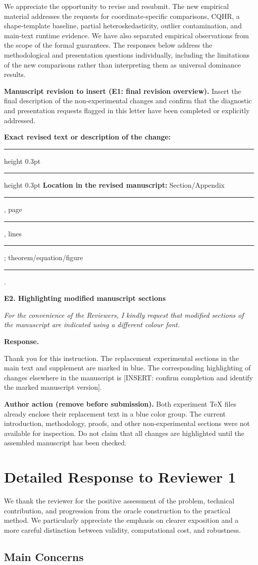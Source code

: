 \documentclass[11pt]{article}
\numberwithin{equation}{section}
\newcommand{\pending}[1]{\textcolor{AuthorRed}{[INSERT: #1]}}
\newcommand{\authoraction}[1]{%
  \par\begingroup\small\color{AuthorRed}%
  \textbf{Author action (remove before submission).} #1\par\endgroup}
\newcommand{\reviewercomment}[2]{%
  \par\medskip\noindent\textbf{#1}\par\nopagebreak
  \begingroup\color{ReviewerBlue}\itshape #2\par\endgroup
  \noindent\textbf{Response.} }
\newcommand{\revisionblock}[2]{%
  \par\begingroup\color{AuthorRed}\small
  \textbf{Manuscript revision to insert (#1).} #2\par
  \textbf{Exact revised text or description of the change:}\par
  \vspace{0.35em}\hrule height 0.3pt\vspace{1.4em}
  \hrule height 0.3pt\vspace{0.6em}
  \textbf{Location in the revised manuscript:}
  Section/Appendix \rule{1.3cm}{0.3pt},
  page \rule{1cm}{0.3pt},
  lines \rule{1.3cm}{0.3pt};
  theorem/equation/figure \rule{1.4cm}{0.3pt}.
  \par\endgroup}
\begin{document}
We appreciate the opportunity to revise and resubmit. The new empirical
material addresses the requests for coordinate-specific comparisons,
CQHR, a shape-template baseline, partial heteroskedasticity, outlier
contamination, and main-text runtime evidence. We have also separated
empirical observations from the scope of the formal guarantees. The
responses below address the methodological and presentation questions
individually, including the limitations of the new comparisons rather
than interpreting them as universal dominance results.

\revisionblock{E1: final revision overview}{Insert the final description
of the non-experimental changes and confirm that the diagnostic and
presentation requests flagged in this letter have been completed or
explicitly addressed.}

\reviewercomment{E2. Highlighting modified manuscript sections}{%
For the convenience of the Reviewers, I kindly request that modified
sections of the manuscript are indicated using a different colour font.}

Thank you for this instruction. The replacement experimental sections in
the main text and supplement are marked in blue. The corresponding
highlighting of changes elsewhere in the manuscript is
\pending{confirm completion and identify the marked manuscript version}.

\authoraction{Both experiment TeX files already enclose their replacement
text in a blue color group. The current introduction, methodology, proofs,
and other non-experimental sections were not available for inspection.
Do not claim that all changes are highlighted until the assembled
manuscript has been checked.}

\section{Detailed Response to Reviewer 1}
\label{sec:reviewer1}

We thank the reviewer for the positive assessment of the problem,
technical contribution, and progression from the oracle construction to
the practical method. We particularly appreciate the emphasis on clearer
exposition and a more careful distinction between validity, computational
cost, and robustness.

\subsection{Main Concerns}
\end{document}
